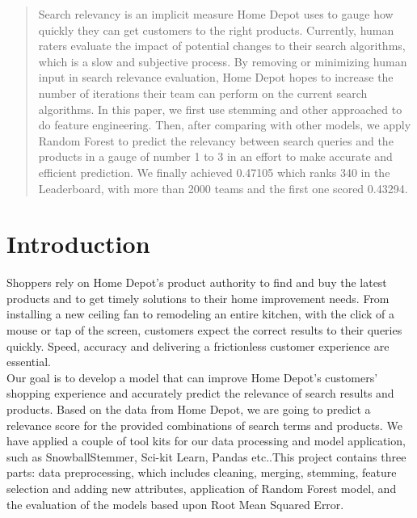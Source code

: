 \documentclass{sig-alternate-05-2015}
\begin{document}
\maketitle
\begin{abstract}

Search relevancy is an implicit measure Home Depot uses to gauge how quickly they can get customers to the right products. Currently, human raters evaluate the impact of potential changes to their search algorithms, which is a slow and subjective process. By removing or minimizing human input in search relevance evaluation, Home Depot hopes to increase the number of iterations their team can perform on the current search algorithms. In this paper, we first use stemming and other approached to do feature engineering. Then, after comparing with other models, we apply Random Forest to predict the relevancy between search queries and the products in a gauge of number 1 to 3 in an effort to make accurate and efficient prediction. We finally achieved 0.47105 which ranks 340 in the Leaderboard, with more than 2000 teams and the first one scored 0.43294.
\end{abstract}

%
%

%
%
\printccsdesc



\section{Introduction}
Shoppers rely on Home Depot's product authority to find and buy the latest products and to get timely solutions to their home improvement needs. From installing a new ceiling fan to remodeling an entire kitchen, with the click of a mouse or tap of the screen, customers expect the correct results to their queries quickly. Speed, accuracy and delivering a frictionless customer experience are essential.\\

Our goal is to develop a model that can improve Home Depot's customers' shopping experience and accurately predict the relevance of search results and products. Based on the data from Home Depot, we are going to predict a relevance score for the provided combinations of search terms and products. We have applied a couple of tool kits for our data processing and model application, such as SnowballStemmer, Sci-kit Learn, Pandas etc..This project contains three parts: data preprocessing, which includes cleaning, merging, stemming, feature selection and adding new attributes, application of Random Forest model, and the evaluation of  the models based upon Root Mean Squared Error. \\
\end{document}
